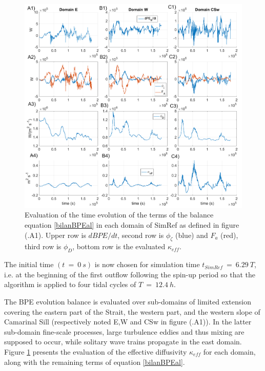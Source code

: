\begin{figure}[h!]
\centering
\includegraphics[width=1\textwidth]{./CHAP_BPE/Fig_Kappa_CS.png}
\caption[Evaluation of $\kappa_{eff}$ in different sub-domains of SimRef]{Evaluation of the time evolution of the terms of the balance equation \ref{bilanBPEal} in each domain of SimRef as defined in figure (.A1). Upper row is $dBPE/dt$, second row is $\phi_{\zeta}$ (blue) and $F_a$ (red), third row is $\phi_D$, bottom row is the evaluated $\kappa_{eff}$.}
\label{figCgbr2d}
\end{figure}
The initial time $(t\ =\ 0\ s)$ is now chosen for simulation time $t_{SimRef}\ =\ 6.29\ T$, i.e. at the beginning of the first outflow following the spin-up period so that the algorithm is applied to four tidal cycles of $T\ =\ 12.4\ h$.%

The BPE evolution balance is evaluated over sub-domains of limited extension covering the eastern part of the Strait, the western part, and the western slope of Camarinal Sill (respectively noted E,W and CSw in figure (.A1)). In the latter sub-domain fine-scale processes, large turbulence eddies and thus mixing are supposed to occur, while solitary wave trains propagate in the east domain. Figure \ref{figCgbr2d} presents the evaluation of the effective diffusivity $\kappa_{eff}$ for each domain, along with the remaining terms of equation \ref{bilanBPEal}.

